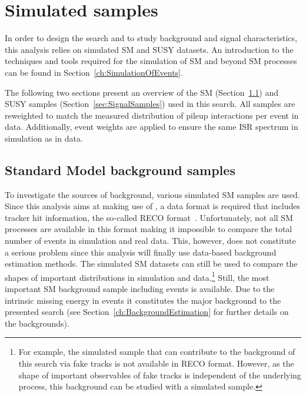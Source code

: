 
\FloatBarrier
\chapter{Simulated samples}
\label{ch:SimulatedSamples}

In order to design the search and to study background and signal characteristics, this analysis relies on simulated  SM and SUSY datasets.
An introduction to the techniques and tools required for the simulation of SM and beyond SM processes can be found in Section~\ref{ch:SimulationOfEvents}.

The following two sections present an overview of the SM (Section~\ref{sec:SMSamples}) and SUSY samples (Section~\ref{sec:SignalSamples}) used in this search.
All samples are reweighted to match the measured distribution of pileup interactions per event in data.
Additionally, event weights are applied to ensure the same ISR spectrum in simulation as in data.

\section{Standard Model background samples}
\label{sec:SMSamples}
To investigate the sources of background, various simulated SM samples are used.
Since this analysis aims at making use of \dedx, a data format is required that includes tracker hit information, the so-called RECO format~\cite{bib:DataFormats}.
Unfortunately, not all SM processes are available in this format making it impossible to compare the total number of events in simulation and real data.
This, however, does not constitute a serious problem since this analysis will finally use data-based background estimation methods.
The simulated SM datasets can still be used to compare the shapes of important distributions in simulation and data.\footnote{For example, the simulated \ZInvJets sample that can contribute to the background of this search via fake tracks is not available in RECO format. However, as the shape of important observables of fake tracks is independent of the underlying process, this background can be studied with a simulated \WJets sample.}
Still, the most important SM background sample including \WJets events is available.
Due to the intrinsic missing energy in \WJets events it constitutes the major background to the presented search (see Section~\ref{ch:BackgroundEstimation} for further details on the backgrounds). \\


